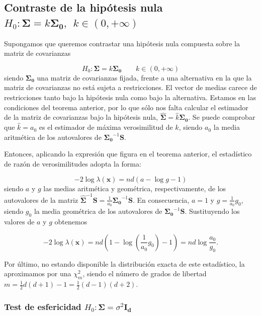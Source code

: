 \documentclass[
  a4paper,
  oneside]{scrbook}
\theoremstyle{definition}
\theoremstyle{definition}
\theoremstyle{definition}
\theoremstyle{definition}
\theoremstyle{remark}
\begin{document}
\subsection{\texorpdfstring{Contraste de la hipótesis nula \(H_0: \bm\Sigma=k\bm{\Sigma_0},\ \ k\in (0,+\infty)\)}{Contraste de la hipótesis nula H\_0: \textbackslash bm\textbackslash Sigma=k\textbackslash bm\{\textbackslash Sigma\_0\},\textbackslash{} \textbackslash{} k\textbackslash in (0,+\textbackslash infty)}}\label{contraste-de-la-hipotesis-nula-h-0-bm-sigma-k-bm-sigma-0-k-in-0-infty}

Supongamos que queremos contrastar una hipótesis nula compuesta sobre la
matriz de covarianzas

\[H_0: \bm\Sigma= k \bm{\Sigma_0}\qquad k\in (0,+\infty)\]
siendo
\(\bm{\Sigma_0}\) una matriz de covarianzas fijada, frente a una
alternativa en la que la matriz de covarianzas no está sujeta a
restricciones. El vector de medias carece de restricciones tanto bajo la
hipótesis nula como bajo la alternativa. Estamos en las condiciones del
teorema anterior, por lo que sólo nos falta calcular el estimador de la
matriz de covarianzas bajo la hipótesis nula,
\(\hat{\bm\Sigma}=\hat{k}\bm{\Sigma_0}\). Se puede comprobar que
\(\hat{k}=a_0\) es el estimador de máxima verosimilitud de \(k\), siendo
\(a_0\) la media aritmética de los autovalores de
\(\bm{\Sigma_0}^{-1}\bm{S}\).

Entonces, aplicando la expresión que figura en el teorema anterior, el
estadístico de razón de verosimilitudes adopta la forma:

\[-2\log\lambda(\bm{x})=nd \left(a-\log g -1\right)\] siendo \(a\) y \(g\)
las medias aritmética y geométrica, respectivamente, de los autovalores
de la matriz
\(\hat{\bm\Sigma}^{-1}\bm{S}=\frac{1}{a_0}\bm{\Sigma_0}^{-1}\bm{S}\). En
consecuencia, \(a=1\) y \(g=\frac{1}{a_0}g_0\), siendo \(g_0\) la media
geométrica de los autovalores de \(\bm{\Sigma_0}^{-1}\bm{S}\).
Sustituyendo los valores de \(a\) y \(g\) obtenemos

\[-2\log\lambda(\bm{x})=nd \left(1-\log\left(\frac{1}{a_0}g_0\right)-1\right)
=nd\log\frac{a_0}{g_0}.\]

Por último, no estando disponible la distribución exacta de este
estadístico, la aproximamos por una \(\chi_m^2\), siendo el número de
grados de libertad \(m=\frac{1}{2}d(d+1)-1=\frac{1}{2}(d-1)(d+2)\).

\subsubsection{\texorpdfstring{Test de esfericidad \(H_0: \bm\Sigma=\sigma^2\bm{I_d}\)}{Test de esfericidad H\_0: \textbackslash bm\textbackslash Sigma=\textbackslash sigma\^{}2\textbackslash bm\{I\_d\}}}\label{test-de-esfericidad-h-0-bm-sigma-sigma-2-bm-i-d}
\end{document}
